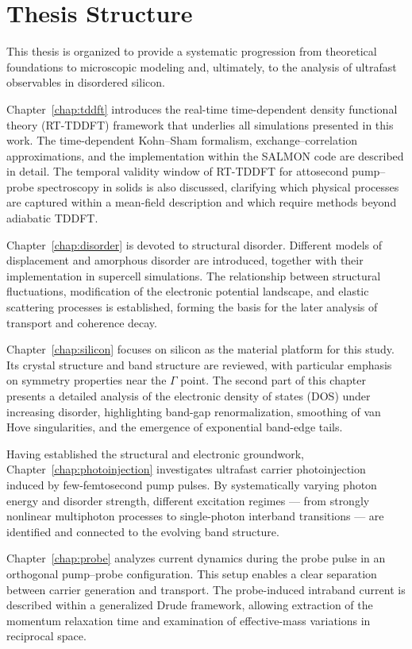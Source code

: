 \section{Thesis Structure}
\label{sec:outline}


This thesis is organized to provide a systematic progression from theoretical foundations to microscopic modeling and, ultimately, to the analysis of ultrafast observables in disordered silicon.

Chapter~\ref{chap:tddft} introduces the real-time time-dependent density functional theory (RT-TDDFT) framework that underlies all simulations presented in this work. The time-dependent Kohn–Sham formalism, exchange–correlation approximations, and the implementation within the SALMON code are described in detail. The temporal validity window of RT-TDDFT for attosecond pump–probe spectroscopy in solids is also discussed, clarifying which physical processes are captured within a mean-field description and which require methods beyond adiabatic TDDFT.

Chapter~\ref{chap:disorder} is devoted to structural disorder. Different models of displacement and amorphous disorder are introduced, together with their implementation in supercell simulations. The relationship between structural fluctuations, modification of the electronic potential landscape, and elastic scattering processes is established, forming the basis for the later analysis of transport and coherence decay.

Chapter~\ref{chap:silicon} focuses on silicon as the material platform for this study. Its crystal structure and band structure are reviewed, with particular emphasis on symmetry properties near the $\Gamma$ point. The second part of this chapter presents a detailed analysis of the electronic density of states (DOS) under increasing disorder, highlighting band-gap renormalization, smoothing of van Hove singularities, and the emergence of exponential band-edge tails.

Having established the structural and electronic groundwork, Chapter~\ref{chap:photoinjection} investigates ultrafast carrier photoinjection induced by few-femtosecond pump pulses. By systematically varying photon energy and disorder strength, different excitation regimes — from strongly nonlinear multiphoton processes to single-photon interband transitions — are identified and connected to the evolving band structure.

Chapter~\ref{chap:probe} analyzes current dynamics during the probe pulse in an orthogonal pump–probe configuration. This setup enables a clear separation between carrier generation and transport. The probe-induced intraband current is described within a generalized Drude framework, allowing extraction of the momentum relaxation time and examination of effective-mass variations in reciprocal space.

